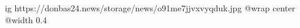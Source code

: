  
 
 
 
 

\ifcmt
  ig https://donbas24.news/storage/news/o91me7jjvxvyqduk.jpg
  @wrap center
  @width 0.4
\fi
